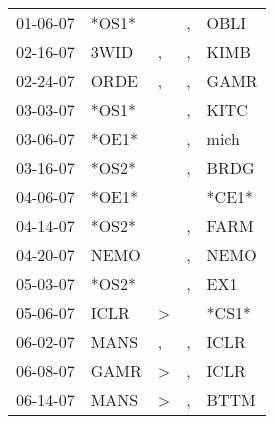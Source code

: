 \begin{supertabular}{p{0.07\textwidth}p{0.06\textwidth}p{0.02\textwidth}p{0.02\textwidth}p{0.06\textwidth}}
          01-06-07\textsuperscript{} &                            *OS1* &                  &                , &           OBLI\textsuperscript{} \\
          02-16-07\textsuperscript{} &           3WID\textsuperscript{} &                , &                , &           KIMB\textsuperscript{} \\
          02-24-07\textsuperscript{} &           ORDE\textsuperscript{} &                , &                , &           GAMR\textsuperscript{} \\
          03-03-07\textsuperscript{} &                            *OS1* &                  &                , &           KITC\textsuperscript{} \\
          03-06-07\textsuperscript{} &                            *OE1* &                  &                , &           mich\textsuperscript{} \\
          03-16-07\textsuperscript{} &                            *OS2* &                  &                , &           BRDG\textsuperscript{} \\
          04-06-07\textsuperscript{} &                            *OE1* &                  &                  &                            *CE1* \\
          04-14-07\textsuperscript{} &                            *OS2* &                  &                , &           FARM\textsuperscript{} \\
          04-20-07\textsuperscript{} &           NEMO\textsuperscript{} &                  &                , &           NEMO\textsuperscript{} \\
          05-03-07\textsuperscript{} &                            *OS2* &                  &                , &            EX1\textsuperscript{} \\
          05-06-07\textsuperscript{} &           ICLR\textsuperscript{} &     \textgreater &                  &                            *CS1* \\
          06-02-07\textsuperscript{} &           MANS\textsuperscript{} &                , &                , &           ICLR\textsuperscript{} \\
          06-08-07\textsuperscript{} &           GAMR\textsuperscript{} &     \textgreater &                , &           ICLR\textsuperscript{} \\
          06-14-07\textsuperscript{} &           MANS\textsuperscript{} &     \textgreater &                , &           BTTM\textsuperscript{} \\

\end{supertabular}
